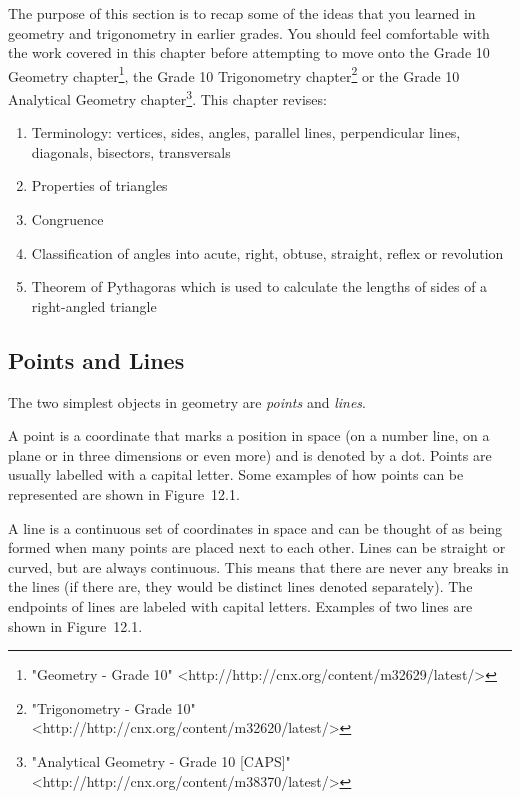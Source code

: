       
      \label{m39370*id313235}The purpose of this section is to recap some of the ideas that you learned in geometry and trigonometry in earlier grades. You should feel comfortable with the work covered in this chapter before attempting to move onto the Grade 10 Geometry chapter\footnote{\raggedright{}"Geometry - Grade 10" <http://http://cnx.org/content/m32629/latest/>}, the Grade 10 Trigonometry chapter\footnote{\raggedright{}"Trigonometry - Grade 10" <http://http://cnx.org/content/m32620/latest/>} or the Grade 10 Analytical Geometry chapter\footnote{\raggedright{}"Analytical Geometry - Grade 10 [CAPS]" <http://http://cnx.org/content/m38370/latest/>}. This chapter revises:\par 
      \label{m39370*id313248}\begin{enumerate}[noitemsep, label=\textbf{\arabic*}. ] 
            \label{m39370*uid1}\item Terminology: vertices, sides, angles, parallel lines, perpendicular lines, diagonals, bisectors, transversals
\label{m39370*uid3}\item Properties of triangles
\label{m39370*uid4}\item Congruence
\label{m39370*uid5}\item Classification of angles into acute, right, obtuse, straight, reflex or revolution
\label{m39370*uid6}\item Theorem of Pythagoras which is used to calculate the lengths of sides of a right-angled triangle
\end{enumerate}
        
    
    \label{m39370*cid3}
            \subsection{ Points and Lines}
            \nopagebreak
            
      
      \label{m39370*id313683}The two simplest objects in geometry are \textsl{points} and \textsl{lines}.\par 
      \label{m39370*id313697}A point is a coordinate that marks a position in space (on a number line, on a plane or in three dimensions or even more) and is denoted by a dot. Points are usually labelled with a capital letter. Some examples of how points can be represented are shown in Figure~12.1.\par 
      \label{m39370*id313707}A line is a continuous set of coordinates in space and can be thought of as being formed when many points are placed next to each other. Lines can be straight or curved, but are always continuous. This means that there are never any breaks in the lines (if there are, they would be distinct lines denoted separately). The endpoints of lines are labeled with capital letters. Examples of two lines are shown in Figure~12.1.\par 
      
